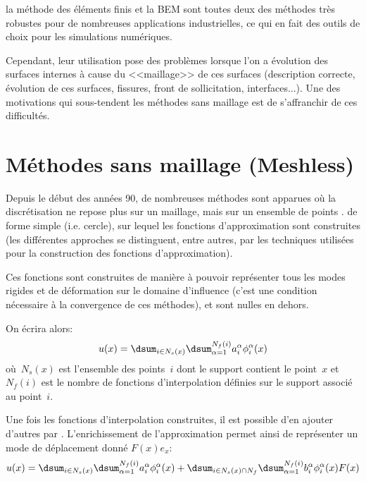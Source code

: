 \medskip
la méthode des éléments finis et la BEM 
sont toutes deux des méthodes très robustes pour de nombreuses 
applications industrielles, ce qui en fait des outils de choix pour les simulations numériques. 

Cependant, leur utilisation pose des problèmes lorsque l'on a évolution des surfaces 
internes à cause du <<maillage>> de ces surfaces (description correcte, évolution de ces surfaces, fissures,
front de sollicitation, interfaces...). 
Une des motivations qui sous-tendent les méthodes sans maillage est de s'affranchir de ces difficultés.



\medskip
\section{Méthodes sans maillage (Meshless)}\label{Sec-meshless}

Depuis le début des années 90, de nombreuses méthodes sont apparues où la discrétisation ne
repose plus sur un maillage, mais sur un ensemble de points . 
 de forme simple (i.e. cercle), sur lequel les fonctions 
d'approximation sont construites (les différentes approches se distinguent, entre autres, par les 
techniques utilisées pour la construction des fonctions d'approximation). 

Ces fonctions sont construites de manière à pouvoir représenter tous les modes rigides et de 
déformation sur le domaine d'influence (c'est une condition nécessaire à la convergence de ces 
méthodes), et sont nulles en dehors.

On écrira alors:
\begin{equation}
u(x) = \dsum_{i\in N_s(x)}\dsum_{\alpha=1}^{N_f(i)} a_i^\alpha \phi_i^\alpha(x)
\end{equation}
où~$N_s(x)$ est l'ensemble des points~$i$ dont le support contient le point~$x$ et~$N_f (i)$ est le nombre 
de fonctions d'interpolation définies sur le support associé au point~$i$.

\medskip
Une fois les fonctions d'interpolation construites, il est possible d'en ajouter d'autres par
. 
L'enrichissement de l'approximation permet ainsi de représenter un mode de déplacement donné
$F(x)e_x$:
\begin{equation}
u(x) = \dsum_{i\in N_s(x)}\dsum_{\alpha=1}^{N_f(i)} a_i^\alpha \phi_i^\alpha(x) +
\dsum_{i\in N_s(x)\cap N_f}\dsum_{\alpha=1}^{N_f(i)} b_i^\alpha\phi_i^\alpha(x)F(x)
\end{equation}

